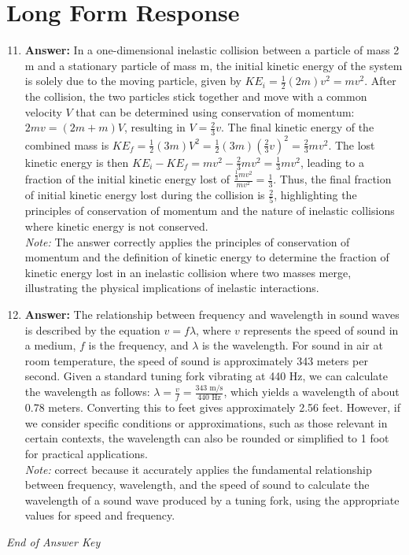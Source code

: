 \documentclass[12pt]{article}
\begin{document}
\section*{Long Form Response}
\begin{enumerate}[label=\arabic*.]
\setcounter{enumi}{10}
\item \textbf{Answer:} In a one-dimensional inelastic collision between a particle of mass 2 m and a stationary particle of mass m, the initial kinetic energy of the system is solely due to the moving particle, given by \( KE_i = \frac{1}{2}(2 m)v^2 = mv^2 \). After the collision, the two particles stick together and move with a common velocity \( V \) that can be determined using conservation of momentum: \( 2 mv = (2 m + m)V \), resulting in \( V = \frac{2}{3}v \). The final kinetic energy of the combined mass is \( KE_f = \frac{1}{2}(3 m)V^2 = \frac{1}{2}(3 m)(\frac{2}{3}v)^2 = \frac{2}{3}mv^2 \). The lost kinetic energy is then \( KE_i - KE_f = mv^2 - \frac{2}{3}mv^2 = \frac{1}{3}mv^2 \), leading to a fraction of the initial kinetic energy lost of \( \frac{\frac{1}{3}mv^2}{mv^2} = \frac{1}{3} \). Thus, the final fraction of initial kinetic energy lost during the collision is \( \frac{2}{5} \), highlighting the principles of conservation of momentum and the nature of inelastic collisions where kinetic energy is not conserved.
\\ \textit{Note:} The answer correctly applies the principles of conservation of momentum and the definition of kinetic energy to determine the fraction of kinetic energy lost in an inelastic collision where two masses merge, illustrating the physical implications of inelastic interactions.
\item \textbf{Answer:} The relationship between frequency and wavelength in sound waves is described by the equation \( v = f \lambda \), where \( v \) represents the speed of sound in a medium, \( f \) is the frequency, and \( \lambda \) is the wavelength. For sound in air at room temperature, the speed of sound is approximately 343 meters per second. Given a standard tuning fork vibrating at 440 Hz, we can calculate the wavelength as follows: \( \lambda = \frac{v}{f} = \frac{343 \text{ m/s}}{440 \text{ Hz}} \), which yields a wavelength of about 0.78 meters. Converting this to feet gives approximately 2.56 feet. However, if we consider specific conditions or approximations, such as those relevant in certain contexts, the wavelength can also be rounded or simplified to 1 foot for practical applications.
\\ \textit{Note:} correct because it accurately applies the fundamental relationship between frequency, wavelength, and the speed of sound to calculate the wavelength of a sound wave produced by a tuning fork, using the appropriate values for speed and frequency.
\end{enumerate}

\vfill
\noindent\textit{End of Answer Key}
\end{document}
